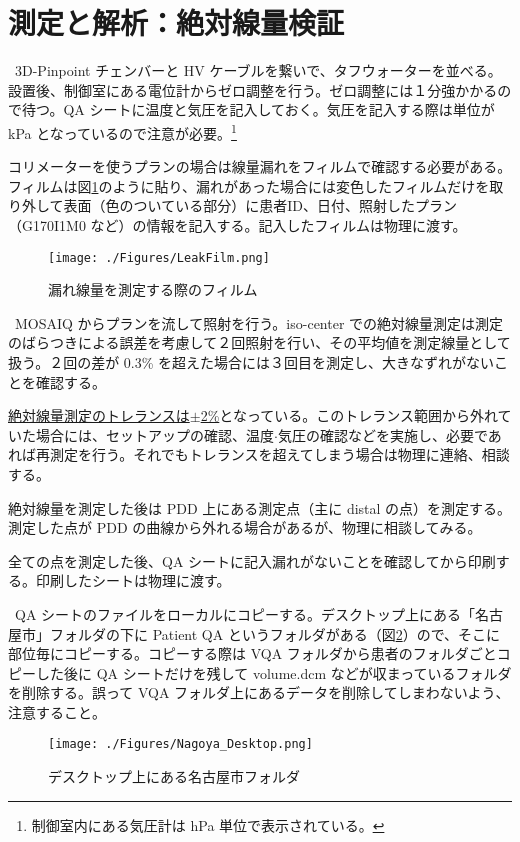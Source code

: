 \documentclass[11pt,a4paper]{jsarticle}
\newcommand{\noindot}{\noindent{$\cdot$}} %
\begin{document}
\section{測定と解析：絶対線量検証}
\noindot ~3D-Pinpoint チェンバーと HV ケーブルを繋いで、タフウォーターを並べる。設置後、制御室にある電位計からゼロ調整を行う。ゼロ調整には１分強かかるので待つ。QA シートに温度と気圧を記入しておく。気圧を記入する際は単位が kPa となっているので注意が必要。\footnote{制御室内にある気圧計は hPa 単位で表示されている。}\par
\noindot コリメーターを使うプランの場合は線量漏れをフィルムで確認する必要がある。フィルムは図\ref{fig:LeakFilm}のように貼り、漏れがあった場合には変色したフィルムだけを取り外して表面（色のついている部分）に患者ID、日付、照射したプラン（G170I1M0 など）の情報を記入する。記入したフィルムは物理に渡す。\par
	\begin{figure}[htbp]
		\centering
		\texttt{[image: ./Figures/LeakFilm.png]}
		\caption{漏れ線量を測定する際のフィルム}
		\label{fig:LeakFilm}
	\end{figure}%
\noindot ~MOSAIQ からプランを流して照射を行う。iso-center での絶対線量測定は測定のばらつきによる誤差を考慮して２回照射を行い、その平均値を測定線量として扱う。２回の差が 0.3\% を超えた場合には３回目を測定し、大きなずれがないことを確認する。\par
\noindot \underline{絶対線量測定のトレランスは$\pm$2\%}となっている。このトレランス範囲から外れていた場合には、セットアップの確認、温度$\cdot$気圧の確認などを実施し、必要であれば再測定を行う。それでもトレランスを超えてしまう場合は物理に連絡、相談する。\par
\noindot 絶対線量を測定した後は PDD 上にある測定点（主に distal の点）を測定する。測定した点が PDD の曲線から外れる場合があるが、物理に相談してみる。\par
\noindot 全ての点を測定した後、QA シートに記入漏れがないことを確認してから印刷する。印刷したシートは物理に渡す。\par
\noindot ~QA シートのファイルをローカルにコピーする。デスクトップ上にある「名古屋市」フォルダの下に Patient QA というフォルダがある（図\ref{fig:Nagoya_Desktop}）ので、そこに部位毎にコピーする。コピーする際は VQA フォルダから患者のフォルダごとコピーした後に QA シートだけを残して volume.dcm などが収まっているフォルダを削除する。誤って VQA フォルダ上にあるデータを削除してしまわないよう、注意すること。
	\begin{figure}[htbp]
		\centering
		\texttt{[image: ./Figures/Nagoya\_Desktop.png]}
		\caption{デスクトップ上にある名古屋市フォルダ}
		\label{fig:Nagoya_Desktop}
	\end{figure}%
\end{document}
